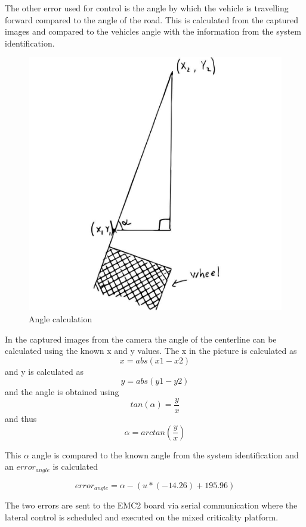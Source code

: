 The other error used for control is the angle by which the vehicle is travelling forward compared to the angle of the road. This is calculated from the captured images and compared to the vehicles angle with the information from the system identification.\\

\begin{figure}[H]
  \includegraphics[scale=0.25]{./img/angle.JPG}
  \centering
  \caption{Angle calculation}
  \label{fig:angle}
\end{figure}


In the captured images from the camera the angle of the centerline can be calculated using the known x and y values. The x in the picture is calculated as $$x = abs(x1-x2)$$ and y is calculated as $$y=abs(y1-y2)$$ and the angle is obtained using $$tan(\alpha)=\frac{y}{x}$$ and thus $$\alpha = arctan(\frac{y}{x})$$

This $\alpha$ angle is compared to the known angle from the system identification and an $error_{angle}$ is calculated

$$error_{angle} = \alpha - (u*(-14.26)+195.96)$$


The two errors are sent to the EMC2 board via serial communication where the lateral control is scheduled and executed on the mixed criticality platform.\\

